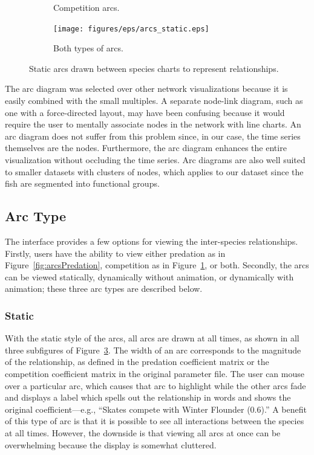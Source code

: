 \begin{figure}
\begin{subfigure}[b]{0.33\textwidth}
		\caption{Competition arcs.}
		\label{fig:arcsCompetition}
	\end{subfigure}
	\begin{subfigure}[b]{0.32\textwidth}
		\centering
		\texttt{[image: figures/eps/arcs\_static.eps]}
		\caption{Both types of arcs.}
		\label{fig:arcsBoth}
	\end{subfigure}
	\caption{Static arcs drawn between species charts to represent relationships.}
	\label{fig:betweenSpeciesArcs}
\end{figure}

The arc diagram was selected over other network visualizations because it is easily combined with the small multiples.  A separate node-link diagram, such as one with a force-directed layout, may have been confusing because it would require the user to mentally associate nodes in the network with line charts.  An arc diagram does not suffer from this problem since, in our case, the time series themselves are the nodes.  Furthermore, the arc diagram enhances the entire visualization without occluding the time series.  Arc diagrams are also well suited to smaller datasets with clusters of nodes, which applies to our dataset since the fish are segmented into functional groups.

\subsection{Arc Type}

The interface provides a few options for viewing the inter-species relationships.  Firstly, users have the ability to view either predation as in Figure~\ref{fig:arcsPredation}, competition as in Figure~\ref{fig:arcsCompetition}, or both.  Secondly, the arcs can be viewed statically, dynamically without animation, or dynamically with animation; these three arc types are described below.

\subsubsection{Static}

With the static style of the arcs, all arcs are drawn at all times, as shown in all three subfigures of Figure~\ref{fig:betweenSpeciesArcs}.  The width of an arc corresponds to the magnitude of the relationship, as defined in the predation coefficient matrix or the competition coefficient matrix in the original parameter file.  The user can mouse over a particular arc, which causes that arc to highlight while the other arcs fade and displays a label which spells out the relationship in words and shows the original coefficient---e.g., ``Skates compete with Winter Flounder (0.6).''  A benefit of this type of arc is that it is possible to see all interactions between the species at all times.  However, the downside is that viewing all arcs at once can be overwhelming because the display is somewhat cluttered.

